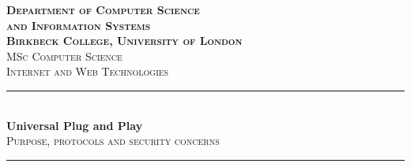\begin{titlepage}

\newcommand{\HRule}{\rule{\linewidth}{0.5mm}} %

\center %
 
 

\textbf{\textsc{\Large Department of Computer Science\\[0.2cm]
and Information Systems
\\[0.4cm]Birkbeck College, University of London}}\\[0.8cm] %
\textsc{\large MSc Computer Science}\\[0.8cm] %
\textsc{\large Internet and Web Technologies}\\[0.5cm] %


\HRule \\[0.4cm]
{ \huge \bfseries Universal Plug and Play}\\[0.1cm] %

\textsc{\large Purpose, protocols and security concerns}
\HRule \\[1cm]
 



\end{titlepage}
